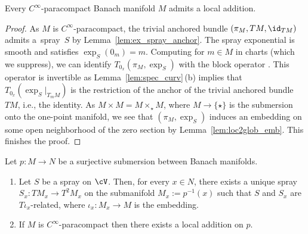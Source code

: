 \begin{Corollary}\label{cor:exp_locadd}
Every $C^\infty$-paracompact Banach manifold $M$ admits a local addition.
\end{Corollary}
\begin{proof}\hspace{-1pt}As $M$ is $C^\infty$-paracompact, the trivial anchored bundle $(\pi_M,TM, \id_{TM})$ admits a~spray~$S$ by Lemma~\ref{lem:ex_spray_anchor}. The spray exponential is smooth and satisfies $\exp_S (0_m)=m$. Computing for $m\in M$ in charts (which we suppress), we can identify $T_{0_x} (\pi_M,\exp_S)$ with the block operator . This operator is invertible as Lemma~\ref{lem:spec_curv}\,(b) implies that $T_{0_x} (\exp_S|_{T_mM})$ is the restriction of the anchor of the trivial anchored bundle~$TM$, i.e., the identity. As $M\times M = M\times_{\star} M$, where $M\rightarrow \{\star\}$ is the submersion onto the one-point manifold, we see that $(\pi_M,\exp_S)$ induces an embedding on some open neighborhood of the zero section by Lemma~\ref{lem:loc2glob_emb}. This finishes the proof.
\end{proof}

\begin{Lemma}\label{lem:con_loc_add_subm}
Let $p\colon M \rightarrow N$ be a surjective submersion between Banach manifolds.
\begin{enumerate}\itemsep=0pt
\item[\textup{(a)}] Let $S$ be a spray on $\cV$.
Then, for every $x \in N$, there exists a unique spray ${S_{x}\colon\! TM_{x}\! \rightarrow\! T^{2}M_{x}}$ on the submanifold $M_x := p^{-1}(x)$ such that $S$ and $S_x$ are $T\iota_x$-related, where $\iota_x \colon M_x \rightarrow M$ is the embedding.
\item[\textup{(b)}] If $M$ is $C^\infty$-paracompact then there exists a local addition on $p$.
\end{enumerate}
\end{Lemma}



